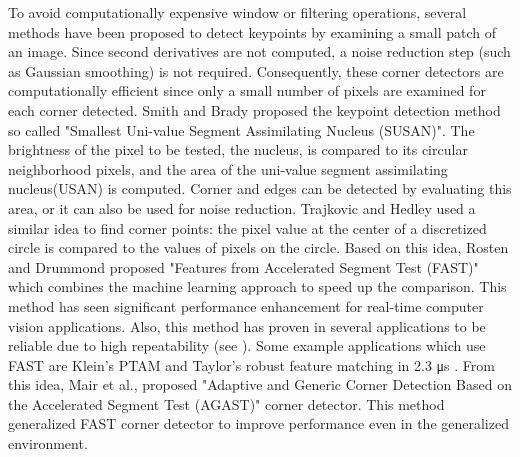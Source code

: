 To avoid computationally expensive window or filtering operations, several methods have been proposed to detect keypoints by examining a small patch of an image. Since second derivatives are not computed, a noise reduction step (such as Gaussian smoothing) is not required. Consequently, these corner detectors are computationally efficient since only a small number of pixels are examined for each corner detected. Smith and Brady proposed the keypoint detection method so called "Smallest Uni-value Segment Assimilating Nucleus (SUSAN)"\cite{smith_susannew_1997}. The brightness of the pixel to be tested, the nucleus, is compared to its circular neighborhood pixels, and the area of the uni-value segment assimilating nucleus(USAN) is computed. Corner and edges can be detected by evaluating this area, or it can also be used for noise reduction. Trajkovic and Hedley\cite{trajkovic_fast_1998} used a similar idea to find corner points: the pixel value at the center of a discretized circle is compared to the values of pixels on the circle. Based on this idea, Rosten and Drummond proposed "Features from Accelerated Segment Test (FAST)"\cite{rosten_machine_2006} which combines the machine learning approach to speed up the comparison. This method has seen significant performance enhancement for real-time computer vision applications. Also, this method has proven in several applications to be reliable due to high repeatability (see \cite{rosten_faster_2010}). Some example applications which use FAST are Klein's PTAM\cite{klein_parallel_2007} and Taylor's robust feature matching in 2.3 \si{\micro\second} \cite{taylor_robust_2009}. From this idea, Mair et al., proposed "Adaptive and Generic Corner Detection Based on the Accelerated Segment Test (AGAST)" corner detector\cite{mair_adaptive_2010}. This method generalized FAST corner detector to improve performance even in the generalized environment.

